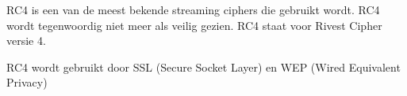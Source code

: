 RC4 is een van de meest bekende streaming ciphers die gebruikt wordt. RC4 wordt tegenwoordig niet meer als veilig gezien. RC4 staat voor Rivest Cipher versie 4.

RC4 wordt gebruikt door SSL (Secure Socket Layer) en WEP (Wired Equivalent Privacy)

